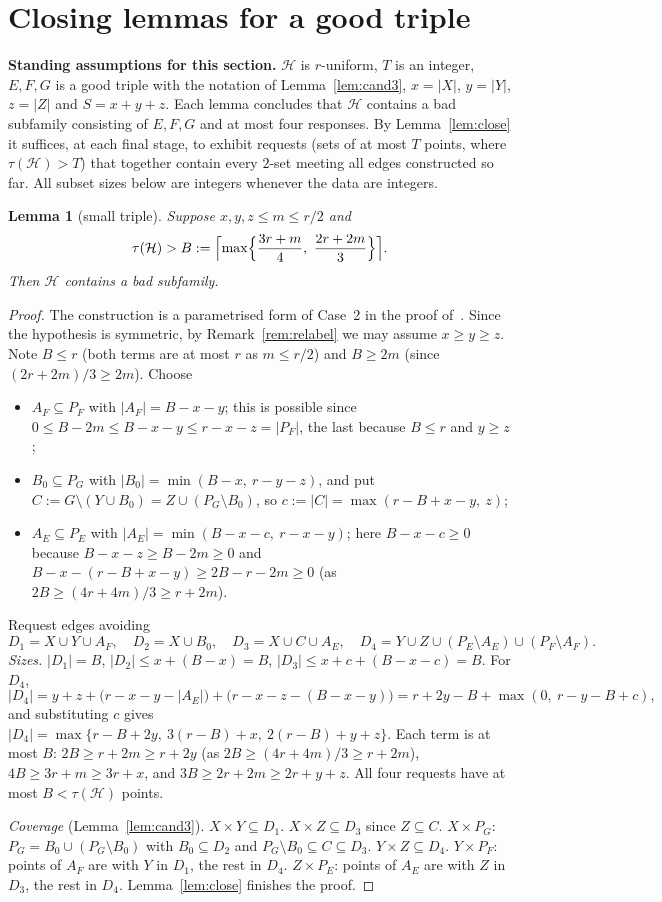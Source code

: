 \documentclass[11pt]{amsart}
\newtheorem{lemma}[theorem]{Lemma}
\theoremstyle{definition}
\theoremstyle{remark}
\newcommand{\cH}{\mathcal H}
\begin{document}
\section{Closing lemmas for a good triple}\label{sec:closing}

\noindent\textbf{Standing assumptions for this section.} $\cH$ is $r$-uniform, $T$ is an integer, $E,F,G$ is a good triple with the notation of Lemma~\ref{lem:cand3}, $x=|X|$, $y=|Y|$, $z=|Z|$ and $S=x+y+z$. Each lemma concludes that $\cH$ contains a bad subfamily consisting of $E,F,G$ and at most four responses. By Lemma~\ref{lem:close} it suffices, at each final stage, to exhibit requests (sets of at most $T$ points, where $\tau(\cH)>T$) that together contain every $2$-set meeting all edges constructed so far. All subset sizes below are integers whenever the data are integers.

\begin{lemma}[small triple]\label{lem:L18}
Suppose $x,y,z\le m\le r/2$ and
\[
\tau(\cH)>B:=\Bigl\lceil\max\Bigl\{\frac{3r+m}{4},\ \frac{2r+2m}{3}\Bigr\}\Bigr\rceil .
\]
Then $\cH$ contains a bad subfamily.
\end{lemma}
\begin{proof}
The construction is a parametrised form of Case~2 in the proof of~\cite[Lemma~1]{FKW}. Since the hypothesis is symmetric, by Remark~\ref{rem:relabel} we may assume $x\ge y\ge z$. Note $B\le r$ (both terms are at most $r$ as $m\le r/2$) and $B\ge 2m$ (since $(2r+2m)/3\ge2m$). Choose
\begin{itemize}
\item $A_F\subseteq P_F$ with $|A_F|=B-x-y$; this is possible since $0\le B-2m\le B-x-y\le r-x-z=|P_F|$, the last because $B\le r$ and $y\ge z$;
\item $B_0\subseteq P_G$ with $|B_0|=\min(B-x,\ r-y-z)$, and put $C:=G\setminus(Y\cup B_0)=Z\cup(P_G\setminus B_0)$, so $c:=|C|=\max(r-B+x-y,\ z)$;
\item $A_E\subseteq P_E$ with $|A_E|=\min(B-x-c,\ r-x-y)$; here $B-x-c\ge0$ because $B-x-z\ge B-2m\ge0$ and $B-x-(r-B+x-y)\ge 2B-r-2m\ge0$ (as $2B\ge(4r+4m)/3\ge r+2m$).
\end{itemize}
Request edges avoiding
\[
D_1=X\cup Y\cup A_F,\quad D_2=X\cup B_0,\quad D_3=X\cup C\cup A_E,\quad D_4=Y\cup Z\cup(P_E\setminus A_E)\cup(P_F\setminus A_F).
\]
\emph{Sizes.} $|D_1|=B$, $|D_2|\le x+(B-x)=B$, $|D_3|\le x+c+(B-x-c)=B$. For $D_4$,
\[
|D_4|=y+z+\bigl(r-x-y-|A_E|\bigr)+\bigl(r-x-z-(B-x-y)\bigr)=r+2y-B+\max(0,\ r-y-B+c),
\]
and substituting $c$ gives $|D_4|=\max\{r-B+2y,\ 3(r-B)+x,\ 2(r-B)+y+z\}$. Each term is at most $B$: $2B\ge r+2m\ge r+2y$ (as $2B\ge(4r+4m)/3\ge r+2m$), $4B\ge3r+m\ge3r+x$, and $3B\ge2r+2m\ge2r+y+z$. All four requests have at most $B<\tau(\cH)$ points.

\emph{Coverage} (Lemma~\ref{lem:cand3}). $X\times Y\subseteq D_1$. $X\times Z\subseteq D_3$ since $Z\subseteq C$. $X\times P_G$: $P_G=B_0\cup(P_G\setminus B_0)$ with $B_0\subseteq D_2$ and $P_G\setminus B_0\subseteq C\subseteq D_3$. $Y\times Z\subseteq D_4$. $Y\times P_F$: points of $A_F$ are with $Y$ in $D_1$, the rest in $D_4$. $Z\times P_E$: points of $A_E$ are with $Z$ in $D_3$, the rest in $D_4$. Lemma~\ref{lem:close} finishes the proof.
\end{proof}
\end{document}
